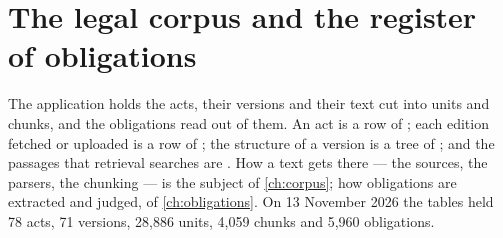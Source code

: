 \section{The legal corpus and the register of obligations}\label{sec:data:corpus}

The application  holds the acts, their versions and their text cut into units and
chunks, and the obligations read out of them. An act is a row of ; each
edition fetched or uploaded is a row of ; the structure of a
version is a tree of ; and the passages that retrieval searches are
. How a text gets there --- the sources, the parsers, the chunking --- is the
subject of \cref{ch:corpus}; how obligations are extracted and judged, of
\cref{ch:obligations}. On 13 November 2026 the tables held 78 acts, 71 versions, 28,886 units,
4,059 chunks and 5,960 obligations.

